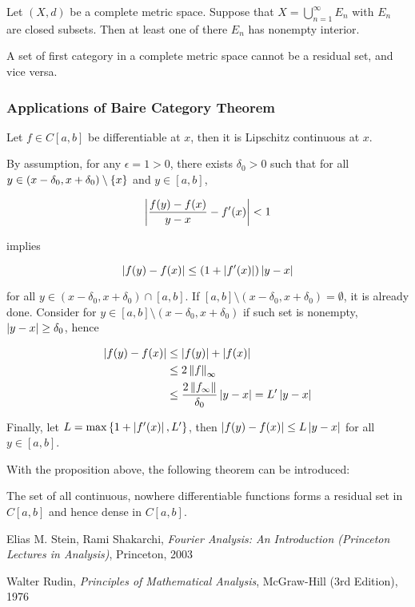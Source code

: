 \documentclass[a4paper,12pt]{article}
\begin{document}
\begin{crl}
  Let $(X,d)$ be a complete metric space. Suppose that $X=\bigcup_{n=1}^{\infty}E_{n}$ with $E_{n}$ are closed subsets. Then at least one of there $E_{n}$ has nonempty interior.
\end{crl}\n

\begin{crl}
  A set of first category in a complete metric space cannot be a residual set, and vice versa.
\end{crl}

\subsubsection{Applications of Baire Category Theorem}
\begin{pst}
  Let $f\in C[a,b]$ be differentiable at $x$, then it is Lipschitz continuous at $x$.\n

  \prf By assumption, for any $\epsilon=1>0$, there exists $\delta_{0}>0$ such that for all $y\in(x-\delta_{0},x+\delta_{0})\setminus\left\{ x\right\}$ and $y\in[a,b]$,

  $$\left| \frac{f(y)-f(x)}{y-x}-f'(x)\right|<1$$\s

  implies

  $$\left| f(y)-f(x)\right|\leq(1+\left| f'(x)\right|)\left| y-x\right|$$\s

  for all $y\in(x-\delta_{0},x+\delta_{0})\cap[a,b]$. If $[a,b]\setminus(x-\delta_{0},x+\delta_{0})=\emptyset$, it is already done. Consider for $y\in[a,b]\setminus(x-\delta_{0},x+\delta_{0})$ if such set is nonempty, $\left| y-x\right|\geq\delta_{0}$, hence

  $$\begin{aligned}[t]
    \left| f(y)-f(x)\right|&\leq\left| f(y)\right|+\left| f(x)\right|\\
    &\leq 2\left\| f\right\|_{\infty}\\
    &\leq\frac{2\left\| f_{\infty}\right\|}{\delta_{0}}\left| y-x\right|=L'\left| y-x\right|
  \end{aligned}$$\s

  Finally, let $L=\max\left\{ 1+\left| f'(x)\right|,L'\right\}$, then $\left| f(y)-f(x)\right|\leq L\left| y-x\right|$ for all $y\in[a,b]$.
\end{pst}\n

With the proposition above, the following theorem can be introduced:\n

\begin{thm}
  The set of all continuous, nowhere differentiable functions forms a residual set in $C[a,b]$ and hence dense in $C[a,b]$.
\end{thm}



\begin{reflist}
  \item Elias M. Stein, Rami Shakarchi, \textit{Fourier Analysis: An Introduction (Princeton Lectures in Analysis)}, Princeton, 2003
  \item Walter Rudin, \textit{Principles of Mathematical Analysis}, McGraw-Hill (3rd Edition), 1976
\end{reflist}
\end{document}
